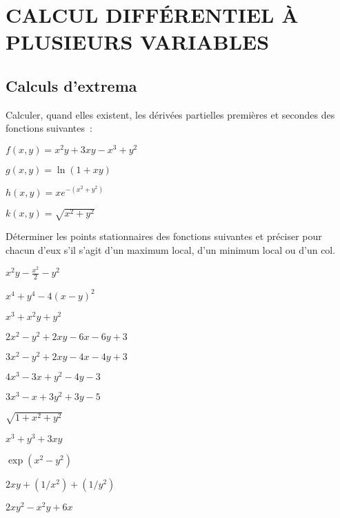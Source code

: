 
\section{CALCUL DIFFÉRENTIEL À PLUSIEURS VARIABLES}


\subsection{Calculs d'extrema}

\begin{exo}
    Calculer, quand elles existent, les dérivées partielles premières et secondes des fonctions suivantes~:
    \begin{examplescol}{2}
        \item $f(x,y) = x^{2}y+3xy-x^{3}+y^{2}$
        \item $g(x,y) = \ln(1+xy)$
        \item $h(x,y) = xe^{-(x^{2}+y^{2})}$
        \item $k(x,y) = \sqrt{x^{2}+y^{2}}$
    \end{examplescol}
\end{exo}

\begin{exo}
    Déterminer les points stationnaires des fonctions suivantes et
    préciser pour chacun d'eux s'il s'agit d'un maximum local, d'un minimum
    local ou d'un col.
    \begin{examplescol}{3}
        \item $x^2y-\frac{x^2}{2}-y^2$
        \item $x^4+y^4-4(x-y)^2$
        \item $x^3 + x^2y + y^2$
        \item $2x^2 -y^2 +2xy-6x-6y+3$
        \item $3x^2 -y^2 +2xy-4x-4y+3$
        \item $4x^3 -3x+y^2 -4y-3$
        \item $3x^3 -x+3y^2 +3y-5$
        \item $\sqrt{1+x^2+y^2}$
        \item $x^3 +y^3 +3xy$
        \item $\exp(x^2 -y^2)$
        \item $2xy + (1/x^2)  + (1/y^2)$
        \item $2xy^2-x^2y+6x$
    \end{examplescol}
\end{exo}

